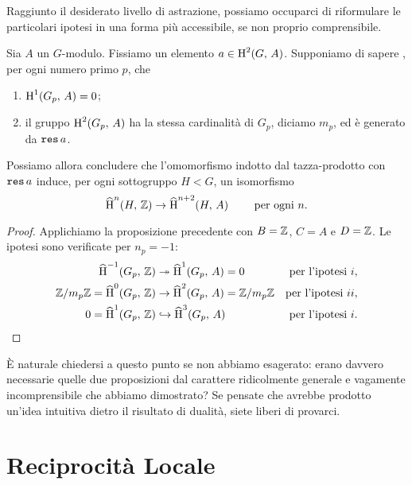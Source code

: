 Raggiunto il desiderato livello di astrazione, possiamo occuparci di riformulare le particolari ipotesi in una forma più accessibile, se non proprio comprensibile.

\begin{theorem}
	Sia $ A $ un $ G $-modulo. Fissiamo un elemento $ a \in \operatorname{H}^2(G, \, A) $. Supponiamo di sapere , per ogni numero primo $ p $, che
	\begin{enumerate}[label = \roman*.]
		\item $ \operatorname{H}^1(G_p, \, A) = 0 $;
		\item il gruppo $ \operatorname{H}^2(G_p, \, A) $ ha la stessa cardinalità di $ G_p $, diciamo $ m_p $, ed è generato da $ \operatorname{\mathtt{res}} a $.
	\end{enumerate}
	Possiamo allora concludere che l'omomorfismo indotto dal tazza-prodotto con $ \operatorname{\mathtt{res}} a $ induce, per ogni sottogruppo $ H < G $, un isomorfismo
	\[ \operatorname{\widehat{H}}^n(H, \, \mathbb{Z}) \to \operatorname{\widehat{H}}^{n+2}(H, \,  A) \qquad \text{ per ogni } n.\]
\end{theorem}

\begin{proof}
	Applichiamo la proposizione precedente con $ B = \mathbb{Z} $, $ C = A $ e $ D = \mathbb{Z} $. Le ipotesi sono verificate per $ n_p = -1 $:
	\begin{align*}
		\operatorname{\widehat{H}}^{-1}(G_p,\, \mathbb{Z}) &\twoheadrightarrow \operatorname{\widehat{H}}^{1}(G_p,\, A) = 0 & \text{per l'ipotesi } i, \\
		\mathbb{Z}/m_p\mathbb{Z}=\operatorname{\widehat{H}}^{0}(G_p,\, \mathbb{Z}) &\to \operatorname{\widehat{H}}^{2}(G_p,\, A) = \mathbb{Z}/m_p\mathbb{Z} & \text{per l'ipotesi } ii,\\
		0 = \operatorname{\widehat{H}}^{1}(G_p,\, \mathbb{Z}) &\hookrightarrow \operatorname{\widehat{H}}^{3}(G_p,\, A) & \text{per l'ipotesi } i.
	\end{align*}
\end{proof}

È naturale chiedersi a questo punto se non abbiamo esagerato: erano davvero necessarie quelle due proposizioni dal carattere ridicolmente generale e vagamente incomprensibile che abbiamo dimostrato? Se pensate che avrebbe prodotto un'idea intuitiva dietro il risultato di dualità, siete liberi di provarci.

\section{Reciprocità Locale}



